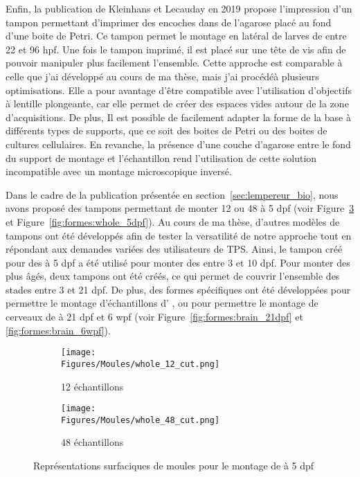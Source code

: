 \documentclass[\main/main.tex]{subfiles}
\begin{document}
Enfin, la publication de Kleinhans et Lecauday en 2019 propose l'impression d'un tampon permettant d'imprimer des encoches dans de l'agarose placé au fond d'une boite de Petri\cite{kleinhans_2019}.
%
Ce tampon permet le montage en latéral de larves de \pz entre 22 et 96 hpf.
%
Une fois le tampon imprimé, il est placé sur une tête de vis afin de pouvoir manipuler plus facilement l'ensemble.
%
Cette approche est comparable à celle que j'ai développé au cours de ma thèse, mais j'ai procédéà plusieurs optimisations.
%
Elle a pour avantage d'être compatible avec l'utilisation d'objectifs à lentille plongeante, car elle permet de créer des espaces vides autour de la zone d'acquisitions.
%
De plus, Il est possible de facilement adapter la forme de la base à différents types de supports, que ce soit des boites de Petri ou des boites de cultures cellulaires.
%
En revanche, la présence d'une couche d'agarose entre le fond du support de montage et l'échantillon rend l'utilisation de cette solution incompatible avec un montage microscopique inversé.

% 
Dans le cadre de la publication présentée en section~\ref{sec:lempereur_bio},
nous avons proposé des tampons permettant de monter 12 ou 48 \pzs{} à 5 dpf 
(voir Figure~\ref{fig:tampon} et Figure~\ref{fig:formes:whole_5dpf}).
%
Au cours de ma thèse, d'autres modèles de tampons ont été développés afin de tester la versatilité de notre approche tout en répondant aux demandes variées des utilisateurs de TPS.
%
Ainsi, le tampon créé pour des \pzs{} à 5 dpf a été utilisé pour monter des \pzs{} entre 3 et 10 dpf.
%
Pour monter des \pzs{} plus âgés, deux tampons ont été créés, ce qui permet de
couvrir l'ensemble des stades entre 3 et 21 dpf.
%
De plus, des formes spécifiques ont été développées pour permettre le montage d'échantillons
d' \ol{}, ou pour permettre le montage de cerveaux de \pz{} à 21 dpf et 6 wpf
(voir Figure~\ref{fig:formes:brain_21dpf} et \ref{fig:formes:brain_6wpf}).

\begin{figure}[htbp]
    \centering
    \begin{subfigure}[b]{0.57\textwidth}
       \caption{
            \label{fig:tampon:12}
            12 échantillons
            }
       \centering \texttt{[image: \\Figures/Moules/whole\_12\_cut.png]}
    \end{subfigure}
    \begin{subfigure}[b]{0.38\textwidth}
       \caption{
        \label{fig:tampon:48}
        48 échantillons
        }
       \centering \texttt{[image: \\Figures/Moules/whole\_48\_cut.png]}
    \end{subfigure}
    \caption{
        \label{fig:tampon}
        Représentations surfaciques de moules pour le montage de \pzs{} à 5 dpf
    }
    
\end{figure}
\end{document}
